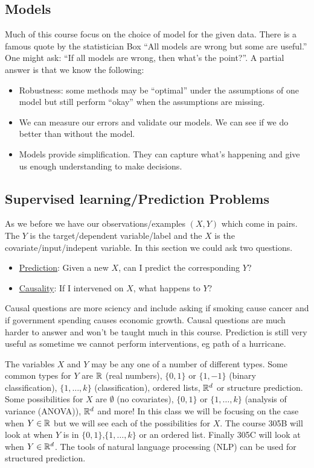 \subsection{Models}
Much of this course focus on the choice of model for the given data. There is a famous quote by the statistician Box ``All models are wrong but some are useful.'' One might ask: ``If all models are wrong, then what's the point?''. A partial answer is that we know the following:
\begin{itemize}
    \item Robustness: some methods may be ``optimal'' under the assumptions of one model but still perform ``okay'' when the assumptions are missing.
    \item We can measure our errors and validate our models. We can see if we do better than without the model.
    \item Models provide simplification. They can capture what's happening and give us enough understanding to make decisions.
\end{itemize}


\subsection{Supervised learning/Prediction Problems}
As we before we have our observations/examples $(X,Y)$ which come in pairs. The $Y$ is the target/dependent variable/label and the $X$ is the covariate/input/indepent variable. In this section we could ask two questions.
\begin{itemize}
    \item \underline{Prediction}: Given a new $X$, can I predict the corresponding $Y$?
    \item \underline{Causality}: If I intervened on $X$, what happens to $Y$?
\end{itemize}
Causal questions are more sciency and include asking if smoking cause cancer and if government spending causes economic growth. Causal questions are much harder to answer and won't be taught much in this course. Prediction is still very useful as sometime we cannot perform interventions, eg path of a hurricane.

The variables $X$ and $Y$ may be any one of a number of different types. Some common types for $Y$ are ${\mathbb R}$ (real numbers), $\{0,1\}$ or $\{1,-1\}$ (binary classification), $\{1,\ldots, k\}$ (classification), ordered lists, ${\mathbb R}^d$ or structure prediction. Some possibilities for $X$ are $\emptyset$ (no covariates), $\{0,1\}$ or $\{1,\ldots,k\}$ (analysis of variance (ANOVA)), ${\mathbb R}^d$ and more! In this class we will be focusing on the case when $Y \in {\mathbb R}$ but we will see each of the possibilities for $X$. The course 305B will look at when $Y$ is in $\{0,1\}$,$\{1,\ldots, k\}$ or an ordered list. Finally 305C will look at when $Y \in {\mathbb R}^d$. The tools of natural language processing (NLP) can be used for structured prediction.



